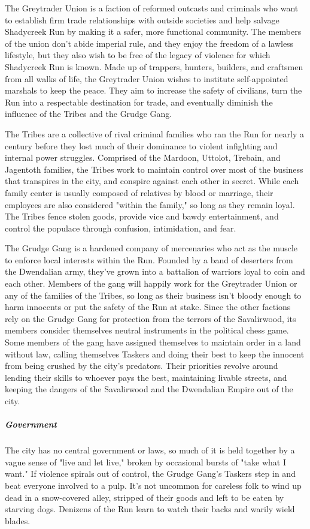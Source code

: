 \documentclass[10pt,a4paper,twoside,bg=print,twocolumn,openany,nodeprecatedcode]{dndbook}
\begin{document}
The Greytrader Union is a faction of reformed outcasts and criminals who want to establish firm trade relationships with outside societies and help salvage Shadycreek Run by making it a safer, more functional community. The members of the union don't abide imperial rule, and they enjoy the freedom of a lawless lifestyle, but they also wish to be free of the legacy of violence for which Shadycreek Run is known. Made up of trappers, hunters, builders, and craftsmen from all walks of life, the Greytrader Union wishes to institute self-appointed marshals to keep the peace. They aim to increase the safety of civilians, turn the Run into a respectable destination for trade, and eventually diminish the influence of the Tribes and the Grudge Gang.

The Tribes are a collective of rival criminal families who ran the Run for nearly a century before they lost much of their dominance to violent infighting and internal power struggles. Comprised of the Mardoon, Uttolot, Trebain, and Jagentoth families, the Tribes work to maintain control over most of the business that transpires in the city, and conspire against each other in secret. While each family center is usually composed of relatives by blood or marriage, their employees are also considered "within the family," so long as they remain loyal. The Tribes fence stolen goods, provide vice and bawdy entertainment, and control the populace through confusion, intimidation, and fear.

The Grudge Gang is a hardened company of mercenaries who act as the muscle to enforce local interests within the Run. Founded by a band of deserters from the Dwendalian army, they've grown into a battalion of warriors loyal to coin and each other. Members of the gang will happily work for the Greytrader Union or any of the families of the Tribes, so long as their business isn't bloody enough to harm innocents or put the safety of the Run at stake. Since the other factions rely on the Grudge Gang for protection from the terrors of the Savalirwood, its members consider themselves neutral instruments in the political chess game. Some members of the gang have assigned themselves to maintain order in a land without law, calling themselves Taskers and doing their best to keep the innocent from being crushed by the city's predators. Their priorities revolve around lending their skills to whoever pays the best, maintaining livable streets, and keeping the dangers of the Savalirwood and the Dwendalian Empire out of the city.

\subparagraph{Government}
The city has no central government or laws, so much of it is held together by a vague sense of "live and let live," broken by occasional bursts of "take what I want." If violence spirals out of control, the Grudge Gang's Taskers step in and beat everyone involved to a pulp. It's not uncommon for careless folk to wind up dead in a snow-covered alley, stripped of their goods and left to be eaten by starving dogs. Denizens of the Run learn to watch their backs and warily wield blades.
\end{document}
